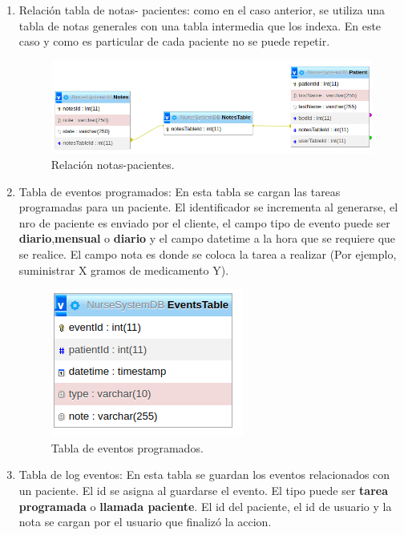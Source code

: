 \begin{enumerate}
\item Relación tabla de notas- pacientes: como en el caso anterior, se utiliza una tabla de notas generales con una tabla intermedia que los indexa. En este caso y como es particular de cada paciente no se puede repetir.


\begin{figure}[ht]
	\centering
	\includegraphics[scale=.45]{./Figures/patient-notes.png}
	\caption{Relación notas-pacientes.}
	\label{fig:Relación notas-pacientes (base de datos)}
\end{figure}

\pagebreak

\item Tabla de eventos programados: En esta tabla se cargan las tareas programadas para un paciente. El identificador se incrementa al generarse, el nro de paciente es enviado por el cliente, el campo tipo de evento puede ser \textbf{diario},\textbf{mensual} o \textbf{diario} y el campo datetime a la hora que se requiere que se realice. El campo nota es donde se coloca la tarea a realizar (Por ejemplo, suministrar X gramos de medicamento Y).


\begin{figure}[ht]
	\centering
	\includegraphics[scale=.45]{./Figures/Events.png}
	\caption{Tabla de eventos programados.}
	\label{fig:Tabla de eventos programados (base de datos)}
\end{figure}


\item Tabla de log eventos: En esta tabla se guardan los eventos relacionados con un paciente. El id se asigna al guardarse el evento. El tipo puede ser \textbf{tarea programada} o \textbf{llamada paciente}. El id del paciente, el id de usuario y la nota se cargan por el usuario que finalizó la accion.



\end{enumerate}
